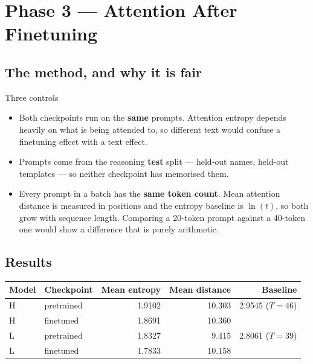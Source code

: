 \documentclass[11pt]{report}
\begin{document}
\chapter{Phase 3 --- Attention After Finetuning}

\section{The method, and why it is fair}

\begin{implementation}{Three controls}
\begin{itemize}
\item Both checkpoints run on the \textbf{same} prompts. Attention entropy
      depends heavily on what is being attended to, so different text would
      confuse a finetuning effect with a text effect.
\item Prompts come from the reasoning \textbf{test} split --- held-out names,
      held-out templates --- so neither checkpoint has memorised them.
\item Every prompt in a batch has the \textbf{same token count}. Mean attention
      distance is measured in positions and the entropy baseline is $\ln(t)$, so
      both grow with sequence length. Comparing a 20-token prompt against a
      40-token one would show a difference that is purely arithmetic.
\end{itemize}
\end{implementation}

\section{Results}

\begin{center}
\begin{tabular}{@{}llrrr@{}}
\toprule
\textbf{Model} & \textbf{Checkpoint} & \textbf{Mean entropy} & \textbf{Mean distance} & \textbf{Baseline} \\
\midrule
H & pretrained & 1.9102 & 10.303 & 2.9545 ($T=46$) \\
H & finetuned & 1.8691 & 10.360 & \\
L & pretrained & 1.8327 & 9.415 & 2.8061 ($T=39$) \\
L & finetuned & 1.7833 & 10.158 & \\
\bottomrule
\end{tabular}
\end{center}
\end{document}
